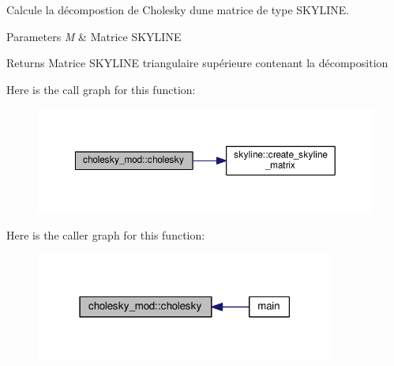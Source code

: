 Calcule la décompostion de Cholesky d\textquotesingle{}une matrice de type S\+K\+Y\+L\+I\+NE. 


\begin{DoxyParams}{Parameters}
{\em M} & Matrice S\+K\+Y\+L\+I\+NE \\
\hline
\end{DoxyParams}
\begin{DoxyReturn}{Returns}
Matrice S\+K\+Y\+L\+I\+NE triangulaire supérieure contenant la décomposition 
\end{DoxyReturn}
Here is the call graph for this function\+:\nopagebreak
\begin{figure}[H]
\begin{center}
\leavevmode
\includegraphics[width=350pt]{namespacecholesky__mod_a1cbaf08b2c159febf9d4a76d7819a1cd_cgraph}
\end{center}
\end{figure}
Here is the caller graph for this function\+:\nopagebreak
\begin{figure}[H]
\begin{center}
\leavevmode
\includegraphics[width=279pt]{namespacecholesky__mod_a1cbaf08b2c159febf9d4a76d7819a1cd_icgraph}
\end{center}
\end{figure}
